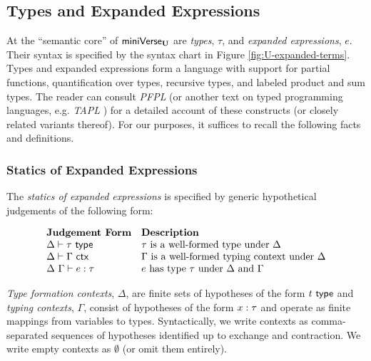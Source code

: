 \subsection{Types and Expanded Expressions}
At the ``semantic core'' of $\mathsf{miniVerse}_\textbf{U}$ are \emph{types}, $\tau$, and \emph{expanded expressions}, $e$. Their syntax is specified by the syntax chart in Figure \ref{fig:U-expanded-terms}. 
Types and expanded expressions form a language with support for partial functions, quantification over types, recursive types, and labeled product and sum types. The reader can consult \emph{PFPL} \cite{pfpl} (or another text on typed programming languages, e.g. \emph{TAPL} \cite{tapl}) for a detailed account of these constructs (or closely related variants thereof). For our purposes, it suffices to recall the following facts and definitions.

\subsubsection{Statics of Expanded Expressions}
The \emph{statics of expanded expressions} is specified by generic hypothetical judgements of the following form:

\[\begin{array}{ll}
\textbf{Judgement Form} & \textbf{Description}\\
\Delta \vdash \tau~\mathsf{type} & \text{$\tau$ is a well-formed type under $\Delta$}\\
\Delta \vdash \Gamma~\mathsf{ctx} & \text{$\Gamma$ is a well-formed typing context under $\Delta$}\\
\Delta~\Gamma \vdash e : \tau & \text{$e$ has type $\tau$ under $\Delta$ and $\Gamma$}
\end{array}\]

\emph{Type formation contexts}, $\Delta$, are finite sets of hypotheses of the form $t~\mathsf{type}$ and \emph{typing contexts}, $\Gamma$, consist of hypotheses of the form $x : \tau$ and operate as finite mappings from variables to types. Syntactically, we write contexts as comma-separated sequences of {hypotheses} identified up to exchange and contraction. We write empty contexts as $\emptyset$ (or omit them entirely). 

